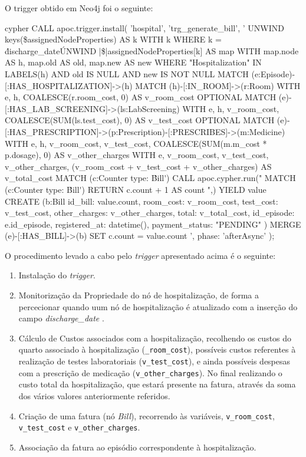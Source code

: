 O trigger obtido em Neo4j foi o seguinte:
\begin{myminted}{cypher}
    CALL apoc.trigger.install(
    'hospital',
    'trg_generate_bill',
    '
    UNWIND keys(\$assignedNodeProperties) AS k
    WITH k
    WHERE k = \'discharge_date\'
    UNWIND |\$|assignedNodeProperties[k] AS map
    WITH map.node AS h, map.old AS old, map.new AS new
    WHERE "Hospitalization" IN LABELS(h) AND old IS NULL AND new IS NOT NULL
    MATCH (e:Episode)-[:HAS_HOSPITALIZATION]->(h)
    MATCH (h)-[:IN_ROOM]->(r:Room)
    WITH e, h, COALESCE(r.room_cost, 0) AS v_room_cost
    OPTIONAL MATCH (e)-[:HAS_LAB_SCREENING]->(ls:LabScreening)
    WITH e, h, v_room_cost, COALESCE(SUM(ls.test_cost), 0) AS v_test_cost
    OPTIONAL MATCH (e)-[:HAS_PRESCRIPTION]->(p:Prescription)-[:PRESCRIBES]->(m:Medicine)
    WITH e, h, v_room_cost, v_test_cost, COALESCE(SUM(m.m_cost * p.dosage), 0) AS v_other_charges
    WITH e, v_room_cost, v_test_cost, v_other_charges, (v_room_cost + v_test_cost + v_other_charges) AS v_total_cost
    MATCH (c:Counter {type: \'Bill\'})
   CALL apoc.cypher.run("
        MATCH (c:Counter {type: \'Bill\'})
        RETURN c.count + 1 AS count
    ",{}) YIELD value
     CREATE (b:Bill {
        id_bill: value.count,
        room_cost: v_room_cost,
        test_cost: v_test_cost,
        other_charges: v_other_charges,
        total: v_total_cost,
        id_episode: e.id_episode,
        registered_at: datetime(),
        payment_status: "PENDING"
    })
    MERGE (e)-[:HAS_BILL]->(b)
    SET c.count = value.count
',
    {phase: 'afterAsync'}
);
\end{myminted}

O procedimento levado a cabo pelo \textit{trigger} apresentado acima é o seguinte:
\begin{enumerate}
    \item Instalação do \textit{trigger}.
    \item  Monitorização da Propriedade do nó de hospitalização, de forma a percecionar quando uum nó de hospitalização é atualizado com a inserção do campo \textit{discharge\_date} .
    \item  Cálculo de Custos associados com a hospitalização, recolhendo os custos do quarto associado à hospitalização (\texttt{\_room\_cost}), possíveis custos referentes à realização de testes laboratoriais (\texttt{v\_test\_cost}), e ainda possíveis despesas com a prescrição de medicação (\texttt{v\_other\_charges}). No final realizando o custo total da hospitalização, que estará presente na fatura, através da soma dos vários valores anteriormente referidos.
    \item  Criação de uma fatura (nó \textit{Bill}), recorrendo às variáveis, \texttt{v\_room\_cost}, \texttt{v\_test\_cost} e \texttt{v\_other\_charges}.
    \item  Associação da fatura ao episódio correspondente à hospitalização.
\end{enumerate}

